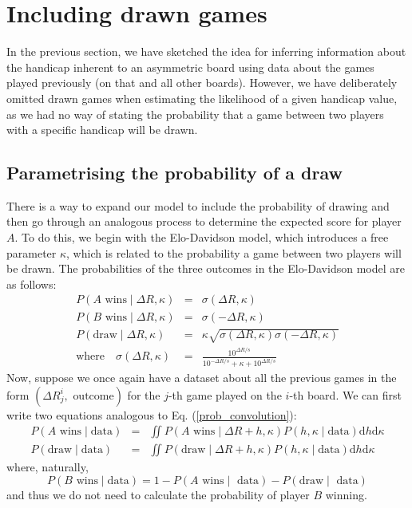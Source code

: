 \documentclass[12pt]{article}
\begin{document}
	\section{Including drawn games}
	In the previous section, we have sketched the idea for inferring information about the handicap inherent to an asymmetric board using data about the games played previously (on that and all other boards). However, we have deliberately omitted drawn games when estimating the likelihood of a given handicap value, as we had no way of stating the probability that a game between two players with a specific handicap will be drawn.
	
	\subsection{Parametrising the probability of a draw}
	
	There is a way to expand our model to include the probability of drawing and then go through an analogous process to determine the expected score for player $A$. To do this, we begin with the Elo-Davidson model, which introduces a free parameter $\kappa$, which is related to the probability a game between two players will be drawn. The probabilities of the three outcomes in the Elo-Davidson model are as follows:
	\begin{eqnarray} \label{elo_davidson}
	P(A\text{ wins}\mid \Delta R,\kappa) &=& \sigma(\Delta R,\kappa)\\
	P(B\text{ wins}\mid \Delta R,\kappa) &=& \sigma(-\Delta R,\kappa)\\
	P(\text{draw}\mid \Delta R,\kappa) &=& \kappa\sqrt{\sigma(\Delta R,\kappa)\sigma(-\Delta R,\kappa)}\\
	\text{where}\quad \sigma(\Delta R, \kappa)&=&\frac{10^{\Delta R/s}}{10^{-\Delta R/s}+\kappa+10^{\Delta R/s}}
	\end{eqnarray}
	Now, suppose we once again have a dataset about all the previous games in the form $(\Delta R^i_j,\text{ outcome})$ for the $j$-th game played on the $i$-th board. We can first write two equations analogous to Eq. (\ref{prob_convolution}):
	\begin{eqnarray} \label{prob_convolution_2}
	P(A\text{ wins}\mid\text{data}) &=& \iint P(A\text{ wins}\mid \Delta R + h, \kappa) P(h,\kappa\mid\text{data}) \text{d}h\text{d}\kappa\\
	P(\text{draw}\mid\text{data}) &=& \iint P(\text{draw}\mid \Delta R + h, \kappa) P(h,\kappa\mid\text{data}) \text{d}h\text{d}\kappa
	\end{eqnarray}
	where, naturally,
	$$P(B\text{ wins}\mid\text{data})=1-P(A\text{ wins}\mid\text{ data})-P(\text{draw}\mid\text{ data})$$
	and thus we do not need to calculate the probability of player $B$ winning.
	
\end{document}
